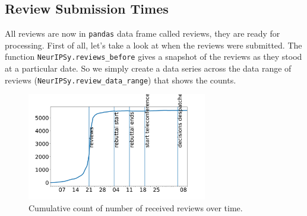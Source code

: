 \begin{Shaded}
\begin{Highlighting}[]
\OperatorTok{=}
\end{Highlighting}
\end{Shaded}

\hypertarget{review-submission-times}{%
\subsection{Review Submission Times}\label{review-submission-times}}

All reviews are now in \texttt{pandas} data frame called reviews, they
are ready for processing. First of all, let's take a look at when the
reviews were submitted. The function \texttt{NeurIPSy.reviews\_before}
gives a snapshot of the reviews as they stood at a particular date. So
we simply create a data series across the data range of reviews
(\texttt{NeurIPSy.review\_data\_range}) that shows the counts.

\begin{Shaded}
\begin{Highlighting}[]
\OperatorTok{=}\OperatorTok{=}
\OperatorTok{=}\NormalTok{ NeurIPSy.reviews\_before(reviews, date).Quality.shape[}\NormalTok{]}
\end{Highlighting}
\end{Shaded}

\begin{figure}[htb]
\includegraphics[width=0.70\textwidth]{diagrams/neurips/review-count.pdf}


\caption{Cumulative count of number of received reviews over time.}
\label{review-count}
\end{figure}

